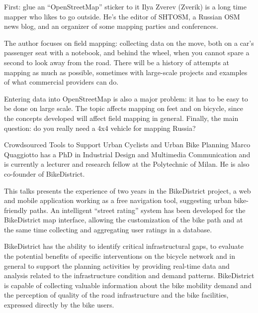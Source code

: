 %
{First: glue an ``OpenStreetMap'' sticker to it}%
{Ilya Zverev (Zverik) is a long time mapper who likes to go outside. He's the editor of SHTOSM, a Russian OSM news blog, and an organizer of some mapping parties and conferences. }%
{The author focuses on field mapping: collecting data on the move, both on a car's passenger seat with a notebook, and behind the wheel, when you cannot spare a second to look away from the road. There will be a history of attempts at mapping as much as possible, sometimes with large-scale projects and examples of what commercial providers can do. 

Entering data into OpenStreetMap is also a major problem: it has to be easy to be done on large scale. The topic affects mapping on feet and on bicycle, since the concepts developed will affect field mapping in general. Finally, the main question: do you really need a 4x4 vehicle for mapping Russia?}

%
{Crowdsourced Tools to Support Urban Cyclists and Urban Bike Planning}%
{Marco Quaggiotto has a PhD in Industrial Design and Multimedia Communication and is currently a lecturer and research fellow at the Polytechnic of Milan. He is also co-founder of BikeDistrict.}
{This talks presents the experience of two years in the BikeDistrict project, a 
web and mobile application working as a free navigation tool, suggesting urban bike-friend\-ly paths. 
An intelligent ``street rating'' system has been developed for the BikeDistrict map interface, allowing the customization of the bike path and at the same time collecting and aggregating user ratings in a database.
 
BikeDistrict has the ability to identify critical infrastructural gaps, to evaluate the potential benefits of specific interventions on the bicycle network and in general to support the planning activities by providing real-time data and analysis related to the infrastructure condition and demand patterns. BikeDistrict is capable of collecting valuable information about the bike mobility demand and the perception of quality of the road infrastructure and the bike facilities, expressed directly by the bike users. }

